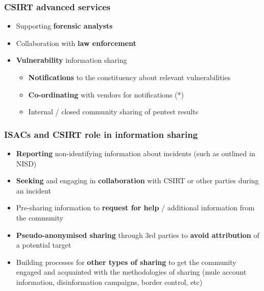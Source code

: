 

\begin{frame}
\frametitle{CSIRT advanced services}
\begin{itemize}
	\item Supporting {\bf forensic analysts}
	\item Collaboration with {\bf law enforcement}
	\item {\bf Vulnerability} information sharing
	\begin{itemize}
		\item {\bf Notifications} to the constituency about relevant vulnerabilities
		\item {\bf Co-ordinating} with vendors for notifications (*)
		\item Internal / closed community sharing of pentest results
	\end{itemize}
\end{itemize}
\end{frame}


\begin{frame}
\frametitle{ISACs and CSIRT role in information sharing}
\begin{itemize}
	\item {\bf Reporting} non-identifying information about incidents (such as outlined in NISD)
	\item {\bf Seeking} and engaging in {\bf collaboration} with CSIRT or other parties during an incident
	\item Pre-sharing information to {\bf request for help} / additional information from the community
	\item {\bf Pseudo-anonymised sharing} through 3rd parties to {\bf avoid attribution} of a potential target
	\item Building processes for {\bf other types of sharing} to get the community engaged and acquainted with the methodologies of sharing (mule account information, disinformation campaigns, border control, etc)
\end{itemize}
\end{frame}

